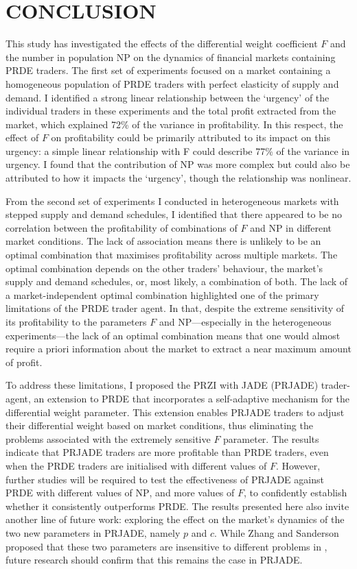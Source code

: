 \documentclass[a4paper,twoside]{article}
\begin{document}
\section{\uppercase{Conclusion}}

This study has investigated the effects of the differential weight coefficient $F$ and the number in population $\mathrm{NP}$ on the dynamics of financial markets containing PRDE traders.
The first set of experiments focused on a market containing a homogeneous population of PRDE traders with perfect elasticity of supply and demand.
I identified a strong linear relationship between the `urgency' of the individual traders in these experiments and the total profit extracted from the market, which explained 72\% of the variance in profitability.
In this respect, the effect of $F$ on profitability could be primarily attributed to its impact on this urgency: a simple linear relationship with F could describe 77\% of the variance in urgency.
I found that the contribution of $\mathrm{NP}$ was more complex but could also be attributed to how it impacts the `urgency', though the relationship was nonlinear.

From the second set of experiments I conducted in heterogeneous markets with stepped supply and demand schedules, I identified that there appeared to be no correlation between the profitability of combinations of $F$ and $\mathrm{NP}$ in different market conditions.
The lack of association means there is unlikely to be an optimal combination that maximises profitability across multiple markets.
The optimal combination depends on the other traders' behaviour, the market's supply and demand schedules, or, most likely, a combination of both.
The lack of a market-independent optimal combination highlighted one of the primary limitations of the PRDE trader agent.
In that, despite the extreme sensitivity of its profitability to the parameters $F$ and $\mathrm{NP}$---especially in the heterogeneous experiments---the lack of an optimal combination means that one would almost require a priori information about the market to extract a near maximum amount of profit.

To address these limitations, I proposed the PRZI with JADE (PRJADE) trader-agent, an extension to PRDE that incorporates a self-adaptive mechanism for the differential weight parameter.
This extension enables PRJADE traders to adjust their differential weight based on market conditions, thus eliminating the problems associated with the extremely sensitive $F$ parameter.
The results indicate that PRJADE traders are more profitable than PRDE traders, even when the PRDE traders are initialised with different values of $F$.
However, further studies will be required to test the effectiveness of PRJADE against PRDE with different values of $\mathrm{NP}$, and more values of $F$, to confidently establish whether it consistently outperforms PRDE.
The results presented here also invite another line of future work: exploring the effect on the market's dynamics of the two new parameters in PRJADE, namely $p$ and $c$.
While Zhang and Sanderson proposed that these two parameters are insensitive to different problems in \cite{ZhangSanderson}, future research should confirm that this remains the case in PRJADE.


{\small
}
\end{document}
